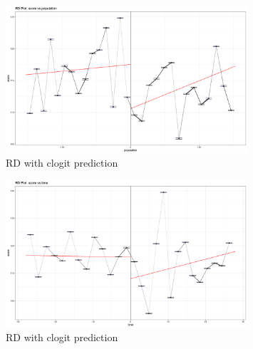 \documentclass{article}
\begin{document}
\begin{figure}[H]
    \centering
    \includegraphics[width=0.8\textwidth]{figures/mixlogit_rd3.png}
    \caption{RD with clogit prediction}
    \label{fig:mixlogit_rd3}
\end{figure}

\begin{figure}[H]
    \centering
    \includegraphics[width=0.8\textwidth]{figures/mixlogit_rd4.png}
    \caption{RD with clogit prediction}
    \label{fig:mixlogit_rd4}
\end{figure}
\end{document}

